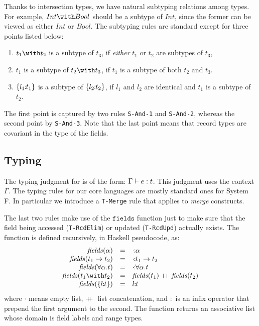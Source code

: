 { \subtype {}}

Thanks to intersection types, we have natural subtyping relations among types.
For example, $ Int \with Bool $ should be a subtype of $ Int $, since the former
can be viewed as either $ Int $ or $ Bool $. The subtyping rules are standard
except for three points listed below:
\begin{enumerate}
\item $ t_1 \with t_2 $ is a subtype of $ t_3 $, if \emph{either} $ t_1 $ or
  $ t_2 $ are subtypes of $ t_3 $,

\item $ t_1 $ is a subtype of $ t_2 \with t_3 $, if $ t_1 $ is a subtype of
  both $ t_2 $ and $ t_3 $.

\item $ \{ l_1 \!\!:\!\! t_1 \} $ is a subtype of $ \{ l_2 \!\!:\!\! t_2 \} $, if
  $ l_1 $ and $ l_2 $ are identical and $ t_1 $ is a subtype of $ t_2 $.
\end{enumerate}
The first point is captured by two rules \texttt{S-And-1} and \texttt{S-And-2},
whereas the second point by \texttt{S-And-3}. Note that the last point means
that record types are covariant in the type of the fields.

\subsection{Typing}

The typing judgment for \name is of the form: $ \Gamma \vdash e : t $. This
judgment uses the context $ \Gamma $. The typing rules for our core languages
are mostly standard ones for System F. In particular we introduce a
\texttt{T-Merge} rule that applies to \emph{merge} constructs.

The last two rules make use of the $ \texttt{fields} $ function just to make
sure that the field being accessed (\texttt{T-RcdElim}) or updated
(\texttt{T-RcdUpd}) actually exists. The function is defined recursively, in
Haskell pseudocode, as:
\[ \begin{array}{rll}
  \fields{\alpha} & = & \rel{\cdot}{\alpha} \\
  \fields{t_1 \to t_2} & = & \rel{\cdot}{t_1 \to t_2} \\
  \fields{\univquant{\alpha}{t}} & = & \rel{\cdot}{\univquant{\alpha}{t}} \\
  \fields{t_1 \with t_2} & = & \fields{t_1} \dplus \fields{t_2} \\
  \fields{\recordtype{l}{t}} & = & \rel{l}{t}
\end{array} \]
where $ \cdot $ means empty list, $ +\!\!\!+ \; $ list concatenation, and $ : $ is an
infix operator that prepend the first argument to the second. The function
returns an associative list whose domain is field labels and range types.

